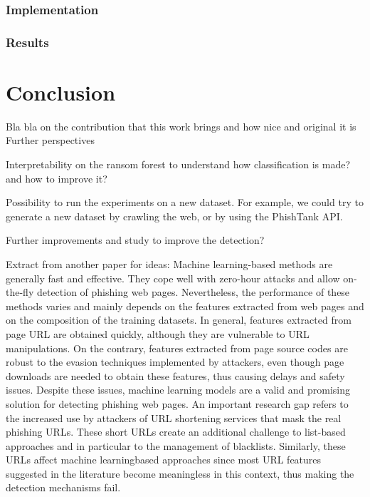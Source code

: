 \documentclass{article}
\begin{document}
    \subsubsection{Implementation}

    \subsubsection{Results}


    \section{Conclusion}\label{sec:conclusion}

    Bla bla on the contribution that this work brings and how nice and original it is
    Further perspectives

    Interpretability on the ransom forest to understand how classification is made? and how to improve it?

    Possibility to run the experiments on a new dataset.
    For example, we could try to generate a new dataset by crawling the web, or by using the PhishTank API.

    Further improvements and study to improve the detection?

    Extract from another paper for ideas:
    Machine learning-based methods are generally fast and
    effective. They cope well with zero-hour attacks and allow
    on-the-fly detection of phishing web pages. Nevertheless, the
    performance of these methods varies and mainly depends on
    the features extracted from web pages and on the composition
    of the training datasets. In general, features extracted from
    page URL are obtained quickly, although they are vulnerable
    to URL manipulations. On the contrary, features extracted
    from page source codes are robust to the evasion techniques
    implemented by attackers, even though page downloads are
    needed to obtain these features, thus causing delays and safety
    issues. Despite these issues, machine learning models are
    a valid and promising solution for detecting phishing web
    pages.
    An important research gap refers to the increased use by
    attackers of URL shortening services that mask the real phishing
    URLs. These short URLs create an additional challenge
    to list-based approaches and in particular to the management
    of blacklists. Similarly, these URLs affect machine learningbased
    approaches since most URL features suggested in the
    literature become meaningless in this context, thus making
    the detection mechanisms fail.
\end{document}
